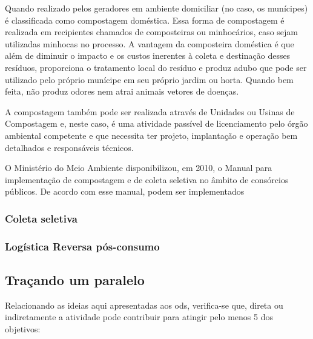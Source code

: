 Quando realizado pelos geradores em ambiente domiciliar (no caso, os munícipes) é classificada como compostagem doméstica. Essa forma de compostagem é realizada em recipientes chamados de composteiras ou minhocários, caso sejam utilizadas minhocas no processo. A vantagem da composteira doméstica é que além de diminuir o impacto e os custos inerentes à coleta e destinação desses resíduos, proporciona o tratamento local do resíduo e produz adubo que pode ser utilizado pelo próprio munícipe em seu próprio jardim ou horta. Quando bem feita, não produz odores nem atrai animais vetores de doenças.

A compostagem também pode ser realizada através de Unidades ou Usinas de Compostagem e, neste caso, é uma atividade passível de licenciamento pelo órgão ambiental competente e que necessita ter projeto, implantação e operação bem detalhados e responsáveis técnicos. 

O Ministério do Meio Ambiente disponibilizou, em 2010, o Manual para implementação de compostagem e de coleta seletiva no âmbito de consórcios públicos. De acordo com esse manual, podem ser implementados  



\subsubsection{Coleta seletiva}



\subsubsection{Logística Reversa pós-consumo}

\subsection{Traçando um paralelo}
Relacionando as ideias aqui apresentadas aos \gls{ods}, verifica-se que, direta ou indiretamente a atividade pode contribuir para atingir pelo menos 5 dos objetivos:

